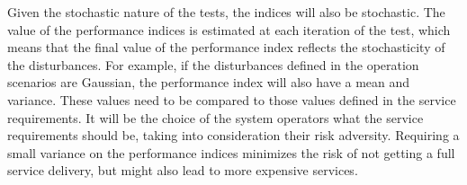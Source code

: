 Given the stochastic nature of the tests, the indices will also be stochastic. The value of the performance indices is estimated at each iteration of the test, which means that the final value of the performance index reflects the stochasticity of the disturbances. For example, if the disturbances defined in the operation scenarios are Gaussian, the performance index will also have a mean and variance. These values need to be compared to those values defined in the service requirements. It will be the choice of the system operators what the service requirements should be, taking into consideration their risk adversity. Requiring a small variance on the performance indices minimizes the risk of not getting a full service delivery, but might also lead to more expensive services.

